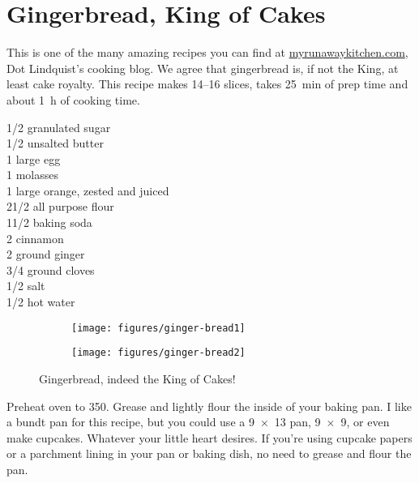 \section{Gingerbread, King of Cakes}

\begin{open}
    This is one of the many amazing recipes you can find at
    \url{myrunawaykitchen.com}, Dot Lindquist's cooking blog.  We agree that
    gingerbread is, if not the King, at least cake royalty.  This recipe makes
    \numrange{14}{16} slices, takes \SI{25}{\minute} of prep time and about
    \SI{1}{\hour} of cooking time.
\end{open}
\begin{ingredients}
    \SI{1/2}{\cup}  granulated sugar\\
    \SI{1/2}{\cup}  unsalted butter\\
    1 large egg\\
    \SI{1}{\cup} molasses\\
    1 large orange, zested and juiced\\
    2\SI{1/2}{\cup}  all purpose flour\\
    1\SI{1/2}{\teaspoon}  baking soda\\
    \SI{2}{\teaspoon} cinnamon\\
    \SI{2}{\teaspoon} ground ginger\\
    \SI{3/4}{\teaspoon}   ground cloves\\
    \SI{1/2}{\teaspoon}  salt\\
    \SI{1/2}{\cup}  hot water
\end{ingredients}
\begin{figure}
    \centering
    \begin{subfigure}{0.6\textwidth}
        \centering
        \texttt{[image: figures/ginger-bread1]}
    \end{subfigure}
    \begin{subfigure}{0.34\textwidth}
        \centering
        \texttt{[image: figures/ginger-bread2]}
    \end{subfigure}
    \caption*{Gingerbread, indeed the King of Cakes!}
\end{figure}
Preheat oven to \SI{350}{\degreeF}. Grease and lightly flour the inside of your
baking pan. I like a bundt pan for this recipe, but you could use a
\SI{9x13}{\inch} pan, \SI{9x9}{\inch}, or even make cupcakes. Whatever your
little heart desires. If you're using cupcake papers or a parchment lining in
your pan or baking dish, no need to grease and flour the pan.

